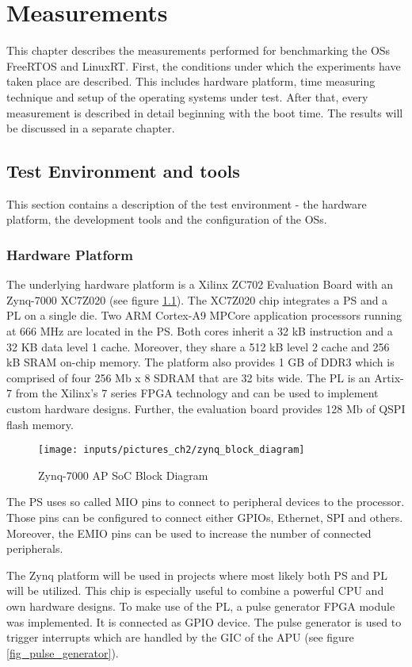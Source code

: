 \chapter{Measurements}\label{ch_measurements}
This chapter describes the measurements performed for benchmarking the \acp{OS} FreeRTOS and LinuxRT.
First, the conditions under which the experiments have taken place are described.
This includes hardware platform, time measuring technique and setup of the operating systems under test.
After that, every measurement is described in detail beginning with the boot time.
The results will be discussed in a separate chapter.

\section{Test Environment and tools}\label{s_test_environments_and_tools}
This section contains a description of the test environment - the hardware platform, the development tools and the configuration of the \acp{OS}.
\subsection{Hardware Platform}
The underlying hardware platform is a Xilinx ZC702 Evaluation Board \cite{xilinx:zc702_ev_board} with an Zynq-7000 XC7Z020 \cite{xilinx:zynq7000} (see figure \ref{fig_zynq_block_diagram}).
The XC7Z020 chip integrates a \ac{PS} and a \ac{PL} on a single die.
Two ARM Cortex-A9 MPCore application processors running at 666 MHz are located in the \ac{PS}.
Both cores inherit a 32 kB instruction and a 32 KB data level 1 cache.
Moreover, they share a 512 kB level 2 cache and 256 kB SRAM on-chip memory.
The platform also provides 1 GB of DDR3 which is comprised of four 256 Mb x 8 SDRAM that are 32 bits wide. 
The \ac{PL} is an Artix-7 from the Xilinx's 7 series \ac{FPGA} technology and can be used to implement custom hardware designs.
Further, the evaluation board provides 128 Mb of \ac{QSPI} flash memory.

\begin{figure}[htb]
		\begin{center}
			\texttt{[image: inputs/pictures\_ch2/zynq\_block\_diagram]}
			\caption[Zynq-7000 AP SoC Block Diagram]{Zynq-7000 AP SoC Block Diagram \cite{xilinx:zc702_ev_board}} \label{fig_zynq_block_diagram}
		\end{center}
\end{figure} 

The \ac{PS} uses so called \ac{MIO} pins to connect to peripheral devices to the processor.
Those pins can be configured to connect either \acp{GPIO}, Ethernet, \ac{SPI} and others.
Moreover, the \ac{EMIO} pins can be used to increase the number of connected peripherals.
\par
The Zynq platform will be used in projects where most likely both \ac{PS} and \ac{PL} will be utilized.
This chip is especially useful to combine a powerful \ac{CPU} and own hardware designs.
To make use of the \ac{PL}, a pulse generator \ac{FPGA} module was implemented.
It is connected as \ac{GPIO} device.
The pulse generator is used to trigger interrupts which are handled by the \ac{GIC} of the \ac{APU} (see figure \ref{fig_pulse_generator}). 

